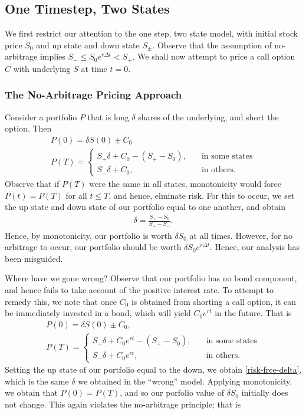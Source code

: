 \documentclass[12pt]{article}
\theoremstyle{plain}
\theoremstyle{definition}
\theoremstyle{remark}
\numberwithin{equation}{section}  %
\begin{document}
\subsection{One Timestep, Two States}
We first restrict our attention to the one step, two state model, with
initial stock price $S_{0}$ and up state and down state $S_{\pm}$. Observe that
the assumption of no-arbitrage implies $S_{-} \le S_{0}e^{r \Delta t} < S_{+}$.
We shall now attempt to price a call option $C$ with underlying $S$ at time
$t=0$. 

\subsubsection{The No-Arbitrage Pricing Approach}
Consider a portfolio $P$ that is long $\delta$
shares of the underlying, and short the option. Then
\begin{gather*}
	P(0)  = \delta S(0) \pm C_{0} 
		\\
		 P(T)  = \begin{cases}
			 S_{+} \delta + C_{0} - (S_{+} - S_{0}), \quad & \text{in some states}
		\\
		S_{-} \delta + C_{0}, \quad & \text{in others}.
	\end{cases}
	\end{gather*}
	Observe that if $P(T)$ were the same in all states, monotonicity would force
	$P(t) = P(T)$ for all $t \le T$, and hence, elminate risk. For this to occur,
	we set the up state and down state of our portfolio equal to one another, and
	obtain 
	\begin{equation}\label{risk-free-delta}
		\begin{split}
			\delta = \frac{S_{+} - S_{0}}{S_{+} - S_{-}}.	
		\end{split}
	\end{equation}
	Hence, by monotonicity, our portfolio is worth $\delta S_{0}$ at all times. 
	However, for no arbitrage to occur, our portfolio should be worth
	$\delta S_{0} e^{r \Delta t}$. Hence, our analysis has been misguided.

	Where have we gone wrong? Observe that our portfolio has no bond component,
	and hence fails to take account of the positive interest rate. To attempt to remedy this, we note that  once $C_{0}$ is obtained from shorting a call option, it can be
	immediately invested in a bond, which will yield $C_{0}e^{rt}$ in the future.
	That is
	\begin{gather*}
		P(0)  = \delta S(0) \pm C_{0},
		\\
		P(T)  = \begin{cases}
			S_{+} \delta + C_{0}e^{rt} - (S_{+} - S_{0}), \quad & \text{in some states}
			\\
			S_{-} \delta + C_{0}e^{rt}, \quad & \text{in others}.
		\end{cases}
	\end{gather*}
Setting the up state of our portfolio equal to the down, we obtain
\eqref{risk-free-delta},
which is the same $\delta$ we obtained in the ``wrong'' model. 
Applying monotonicity, we obtain that $P(0) = P(T)$, and so our porfolio value
of $\delta S_{0}$ initially does not change. This again violates the
no-arbitrage principle; that is
\end{document}
